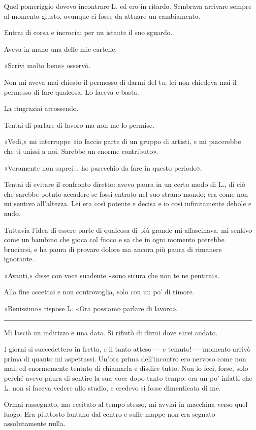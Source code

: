 \documentclass[a4paper,11pt,oneside,openright,final]{memoir}
\begin{document}
Quel pomeriggio dovevo incontrare L. ed ero in ritardo. Sembrava arrivare sempre
al momento giusto, ovunque ci fosse da attuare un cambiamento.

Entrai di corsa e incrociai per un istante il suo sguardo.

Aveva in mano una delle mie cartelle.

«Scrivi molto bene» osservò.

Non mi aveva mai chiesto il permesso di darmi del tu; lei non chiedeva mai
il permesso di fare qualcosa. Lo faceva e basta.

La ringraziai arrossendo.

Tentai di parlare di lavoro ma non me lo permise.

«Vedi,» mi interruppe «io faccio parte di un gruppo di artisti, e mi
piacerebbe che ti unissi a noi. Sarebbe un enorme contributo».

«Veramente non saprei... ho parecchio da fare in questo periodo».

Tentai di evitare il confronto diretto: avevo paura in un certo modo di L., di
ciò che sarebbe potuto accadere se fossi entrato nel suo strano mondo; era come
non mi sentivo all'altezza. Lei era così potente e decisa e io così
infinitamente debole e nudo.

Tuttavia l'idea di essere parte di qualcosa di più grande mi affascinava: mi
sentivo come un bambino che gioca col fuoco e sa che in ogni momento potrebbe
bruciarsi, e ha paura di provare dolore ma ancora più paura di rimanere
ignorante.

«Avanti,» disse con voce suadente «sono sicura che non te ne pentirai».

Alla fine accettai e non controvoglia, solo con un po' di timore.

«Benissimo» rispose L. «Ora possiamo parlare di lavoro».

\plainbreak{1}

Mi lasciò un indirizzo e una data. Si rifiutò di dirmi dove sarei andato.

I giorni si succedettero in fretta, e il tanto atteso --- e temuto! --- momento
arrivò prima di quanto mi aspettassi. Un'ora prima dell'incontro ero nervoso
come non mai, ed enormemente tentato di chiamarla e disdire tutto. Non lo feci,
forse, solo perché avevo paura di sentire la sua voce dopo tanto tempo: era un
po' infatti che L. non si faceva vedere allo studio, e credevo si fosse
dimenticata di me.

Ormai rassegnato, ma eccitato al tempo stesso, mi avviai in macchina verso
quel luogo. Era piuttosto lontano dal centro e sulle mappe non era segnato
assolutamente nulla.
\end{document}
